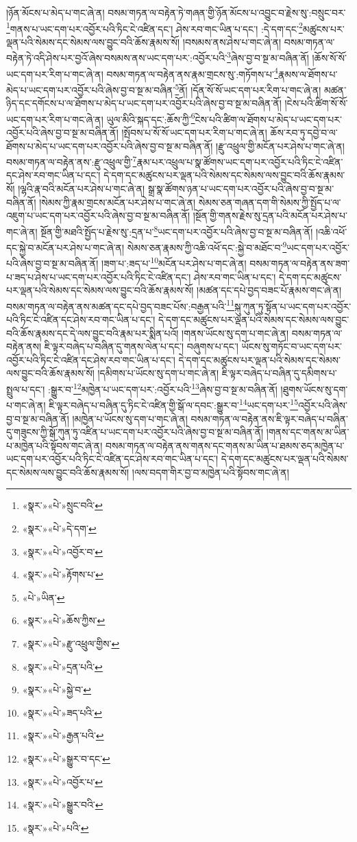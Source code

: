 །ཉོན་མོངས་པ་མེད་པ་གང་ཞེ་ན། བསམ་གཏན་ལ་བརྟེན་ཏེ་གཞན་གྱི་ཉོན་མོངས་པ་འབྱུང་བ་རྗེས་སུ་:བསྲུང་བར་\footnote{«སྣར་»«པེ་»སྲུང་བའི་}གནས་པ་ཡང་དག་པར་འབྱོར་པའི་ཏིང་ངེ་འཛིན་དང་། ཤེས་རབ་གང་ཡིན་པ་དང་། :དེ་དག་དང་\footnote{«སྣར་»«པེ་»དེ་དག་}མཚུངས་པར་ལྡན་པའི་སེམས་དང་སེམས་ལས་བྱུང་བའི་ཆོས་རྣམས་སོ། །བསམས་ནས་ཤེས་པ་གང་ཞེ་ན། བསམ་གཏན་ལ་བརྟེན་ཏེ་འདི་ཤེས་པར་བྱའོ་ཞེས་བསམས་ནས་ཡང་དག་པར་:འབྱོར་པའི་\footnote{«སྣར་»«པེ་»འབྱོར་བ་}ཞེས་བྱ་བ་སྔ་མ་བཞིན་ནོ། །ཆོས་སོ་སོ་ཡང་དག་པར་རིག་པ་གང་ཞེ་ན། བསམ་གཏན་ལ་བརྟེན་ནས་རྣམ་གྲངས་སུ་:གཏོགས་པ་\footnote{«སྣར་»«པེ་»རྟོགས་པ་}རྣམས་ལ་ཐོགས་པ་མེད་པ་ཡང་དག་པར་འབྱོར་པའི་ཞེས་བྱ་བ་སྔ་མ་བཞིན་\footnote{«པེ་»ཡིན་}ནོ། །དོན་སོ་སོ་ཡང་དག་པར་རིག་པ་གང་ཞེ་ན། མཚན་ཉིད་དང་དགོངས་པ་ལ་ཐོགས་པ་མེད་པ་ཡང་དག་པར་འབྱོར་པའི་ཞེས་བྱ་བ་སྔ་མ་བཞིན་ནོ། །ངེས་པའི་ཚིག་སོ་སོ་ཡང་དག་པར་རིག་པ་གང་ཞེ་ན། ཡུལ་མིའི་སྐད་དང་:ཆོས་ཀྱི་\footnote{«སྣར་»«པེ་»ཆོས་ཀྱིས་}ངེས་པའི་ཚིག་ལ་ཐོགས་པ་མེད་པ་ཡང་དག་པར་འབྱོར་པའི་ཞེས་བྱ་བ་སྔ་མ་བཞིན་ནོ། །སྤོབས་པ་སོ་སོ་ཡང་དག་པར་རིག་པ་གང་ཞེ་ན། ཆོས་རབ་ཏུ་དབྱེ་བ་ལ་ཐོགས་པ་མེད་པ་ཡང་དག་པར་འབྱོར་པའི་ཞེས་བྱ་བ་སྔ་མ་བཞིན་ནོ། །རྫུ་འཕྲུལ་གྱི་མངོན་པར་ཤེས་པ་གང་ཞེ་ན། བསམ་གཏན་ལ་བརྟེན་ནས་:རྫུ་འཕྲུལ་གྱི་\footnote{«སྣར་»«པེ་»རྫུ་འཕྲུལ་གྱིས་}རྣམ་པར་འཕྲུལ་པ་སྣ་ཚོགས་ཡང་དག་པར་འབྱོར་པའི་ཏིང་ངེ་འཛིན་དང་ཤེས་རབ་གང་ཡིན་པ་དང་། དེ་དག་དང་མཚུངས་པར་ལྡན་པའི་སེམས་དང་སེམས་ལས་བྱུང་བའི་ཆོས་རྣམས་སོ། །ལྷའི་རྣ་བའི་མངོན་པར་ཤེས་པ་གང་ཞེ་ན། སྒྲ་སྣ་ཚོགས་ཉན་པ་ཡང་དག་པར་འབྱོར་པའི་ཞེས་བྱ་བ་སྔ་མ་བཞིན་ནོ། །སེམས་ཀྱི་རྣམ་གྲངས་མངོན་པར་ཤེས་པ་གང་ཞེ་ན། སེམས་ཅན་གཞན་དག་གི་སེམས་ཀྱི་སྤྱོད་པ་ལ་འཇུག་པ་ཡང་དག་པར་འབྱོར་པའི་ཞེས་བྱ་བ་སྔ་མ་བཞིན་ནོ། །སྔོན་གྱི་གནས་རྗེས་སུ་དྲན་པའི་མངོན་པར་ཤེས་པ་གང་ཞེ་ན། སྔོན་གྱི་མཐའི་སྤྱོད་པ་རྗེས་སུ་:དྲན་པ་\footnote{«སྣར་»«པེ་»དྲན་པའི་}ཡང་དག་པར་འབྱོར་པའི་ཞེས་བྱ་བ་སྔ་མ་བཞིན་ནོ། །འཆི་འཕོ་དང་སྐྱེ་བ་མངོན་པར་ཤེས་པ་གང་ཞེ་ན། སེམས་ཅན་རྣམས་ཀྱི་འཆི་འཕོ་དང་:སྐྱེ་བ་མཐོང་བ་\footnote{«སྣར་»«པེ་»སྐྱེ་བ་}ཡང་དག་པར་འབྱོར་པའི་ཞེས་བྱ་བ་སྔ་མ་བཞིན་ནོ། །ཟག་པ་:ཟད་པ་\footnote{«སྣར་»«པེ་»ཟད་པའི་}མངོན་པར་ཤེས་པ་གང་ཞེ་ན། བསམ་གཏན་ལ་བརྟེན་ནས་ཟག་པ་ཟད་པ་ཤེས་པ་ཡང་དག་པར་འབྱོར་པའི་ཏིང་ངེ་འཛིན་དང་། ཤེས་རབ་གང་ཡིན་པ་དང་། དེ་དག་དང་མཚུངས་པར་ལྡན་པའི་སེམས་དང་སེམས་ལས་བྱུང་བའི་ཆོས་རྣམས་སོ། །མཚན་དང་དཔེ་བྱད་བཟང་པོ་རྣམས་གང་ཞེ་ན། བསམ་གཏན་ལ་བརྟེན་ནས་མཚན་དང་དཔེ་བྱད་བཟང་པོས་:བརྒྱན་པའི་\footnote{«སྣར་»«པེ་»རྒྱན་པའི་}སྐུ་ཀུན་ཏུ་སྟོན་པ་ཡང་དག་པར་འབྱོར་པའི་ཏིང་ངེ་འཛིན་དང་ཤེས་རབ་གང་ཡིན་པ་དང་། དེ་དག་དང་མཚུངས་པར་ལྡན་པའི་སེམས་དང་སེམས་ལས་བྱུང་བའི་ཆོས་རྣམས་དང་དེ་ལས་བྱུང་བའི་རྣམ་པར་སྨིན་པའོ། །གནས་ཡོངས་སུ་དག་པ་གང་ཞེ་ན། བསམ་གཏན་ལ་བརྟེན་ནས། ཇི་ལྟར་བཞེད་པ་བཞིན་དུ་གནས་ལེན་པ་དང་། བཞུགས་པ་དང་། ཡོངས་སུ་གཏོང་བ་ཡང་དག་པར་འབྱོར་པའི་ཏིང་ངེ་འཛིན་དང་ཤེས་རབ་གང་ཡིན་པ་དང་། དེ་དག་དང་མཚུངས་པར་ལྡན་པའི་སེམས་དང་སེམས་ལས་བྱུང་བའི་ཆོས་རྣམས་སོ། །དམིགས་པ་ཡོངས་སུ་དག་པ་གང་ཞེ་ན། ཇི་ལྟར་བཞེད་པ་བཞིན་དུ་དམིགས་པ་སྤྲུལ་པ་དང་། :སྒྱུར་བ་\footnote{«སྣར་»«པེ་»སྒྱུར་བ་དང་}མཁྱེན་པ་ཡང་དག་པར་:འབྱོར་པའི་\footnote{«སྣར་»«པེ་»འབྱོར་པ་}ཞེས་བྱ་བ་སྔ་མ་བཞིན་ནོ། །ཐུགས་ཡོངས་སུ་དག་པ་གང་ཞེ་ན། ཇི་ལྟར་བཞེད་པ་བཞིན་དུ་ཏིང་ངེ་འཛིན་གྱི་སྒོ་ལ་དབང་:སྒྱུར་བ་\footnote{«སྣར་»«པེ་»སྒྱུར་བའི་}ཡང་དག་པར་\footnote{«སྣར་»«པེ་»པའི་}འབྱོར་པའི་ཞེས་བྱ་བ་སྔ་མ་བཞིན་ནོ། །མཁྱེན་པ་ཡོངས་སུ་དག་པ་གང་ཞེ་ན། བསམ་གཏན་ལ་བརྟེན་ནས་ཇི་ལྟར་བཞེད་པ་བཞིན་དུ་གཟུངས་ཀྱི་སྒོ་ཀུན་ཏུ་འཛིན་པ་ཡང་དག་པར་འབྱོར་པའི་ཞེས་བྱ་བ་སྔ་མ་བཞིན་ནོ། །གནས་དང་གནས་མ་ཡིན་པ་མཁྱེན་པའི་སྟོབས་གང་ཞེ་ན། བསམ་གཏན་ལ་བརྟེན་ནས་གནས་དང་གནས་མ་ཡིན་པ་ཐམས་ཅད་མཁྱེན་པ་ཡང་དག་པར་འབྱོར་པའི་ཏིང་ངེ་འཛིན་དང་ཤེས་རབ་གང་ཡིན་པ་དང་། དེ་དག་དང་མཚུངས་པར་ལྡན་པའི་སེམས་དང་སེམས་ལས་བྱུང་བའི་ཆོས་རྣམས་སོ། །ལས་བདག་གིར་བྱ་བ་མཁྱེན་པའི་སྟོབས་གང་ཞེ་ན། 